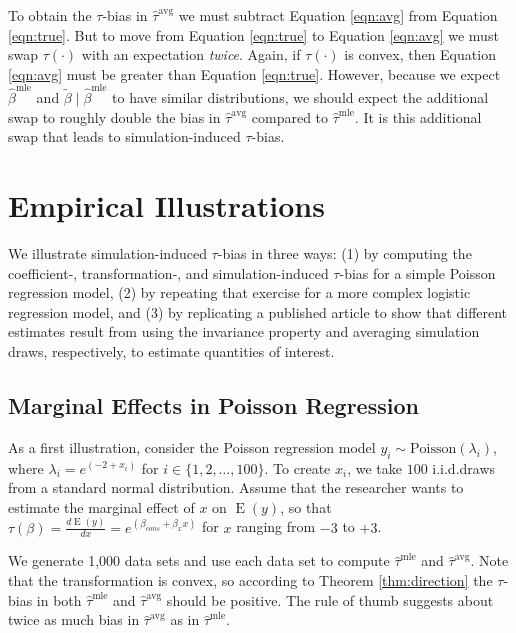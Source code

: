 \documentclass[11pt]{article}
\DeclareMathOperator*{\E}{\text{E}}
\begin{document}
To obtain the $\tau$-bias in $\hat{\tau}^\text{avg}$ we must subtract Equation \ref{eqn:avg} from Equation \ref{eqn:true}.
But to move from Equation \ref{eqn:true} to Equation \ref{eqn:avg} we must swap $\tau(\cdot)$ with an expectation \emph{twice}.
Again, if $\tau(\cdot)$ is convex, then Equation \ref{eqn:avg} must be greater than Equation \ref{eqn:true}.
However, because we expect $\hat{\beta}^\text{mle}$ and $\tilde{\beta} \mid \hat{\beta}^\text{mle}$ to have similar distributions, we should expect the additional swap to roughly double the bias in $\hat{\tau}^\text{avg}$ compared to $\hat{\tau}^\text{mle}$. It is this additional swap that leads to simulation-induced $\tau$-bias.


\section*{Empirical Illustrations}

We illustrate simulation-induced $\tau$-bias in three ways: (1) by computing the coefficient-, \mbox{transformation-,} and simulation-induced $\tau$-bias for a simple Poisson regression model, (2) by repeating that exercise for a more complex logistic regression model, and (3) by replicating a published article to show that different estimates result from using the invariance property and averaging simulation draws, respectively, to estimate quantities of interest.


\subsection*{Marginal Effects in Poisson Regression}

As a first illustration, consider the Poisson regression model $y_i \sim \text{Poisson}(\lambda_i)$, where $\lambda_i = e^{(-2 + x_i)}$ for $i \in \{1, 2,\ldots, 100\}$.
To create $x_i$, we take $100$ i.i.d.\@ draws from a standard normal distribution.
Assume that the researcher wants to estimate the marginal effect of $x$ on $\E(y)$, so that $\tau(\beta) = \frac{d \E (y)}{dx} = e^{(\beta_{cons} + \beta_x x)}$ for $x$ ranging from $-3$ to $+3$.


We generate 1,000 data sets and use each data set to compute $\hat{\tau}^\text{mle}$ and $\hat{\tau}^\text{avg}$.
Note that the transformation is convex, so according to Theorem \ref{thm:direction} the $\tau$-bias in both $\hat{\tau}^\text{mle}$ and $\hat{\tau}^\text{avg}$ should be positive.
The rule of thumb suggests about twice as much bias in $\hat{\tau}^\text{avg}$ as in $\hat{\tau}^\text{mle}$.
\end{document}
